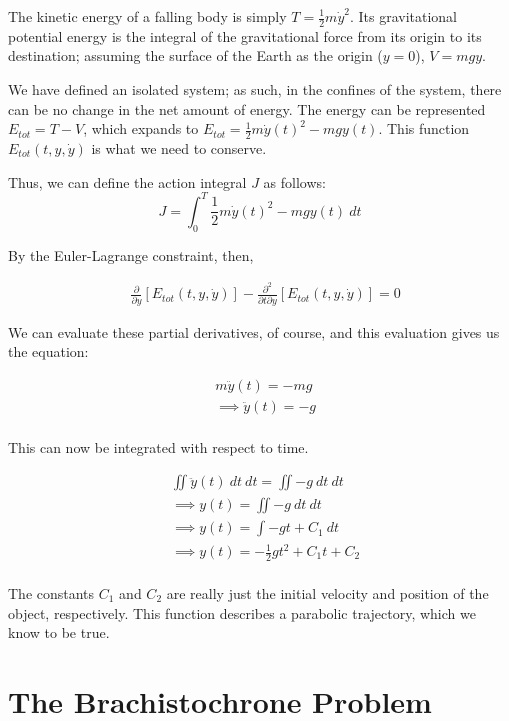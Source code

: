 \documentclass[%
 preprint,
 amsmath,amssymb,
 aps,
 pra,
 fleqn,
]{revtex4-2}
\begin{document}
The kinetic energy of a falling body is simply $\displaystyle T = \frac12 m\dot y^2$.  Its gravitational potential energy is the integral of the gravitational force from its origin to its destination; assuming the surface of the Earth as the origin ($y = 0$), $\displaystyle V = mgy$.

We have defined an isolated system; as such, in the confines of the system, there can be no change in the net amount of energy.  The energy can be represented $E_{tot} = T - V$, which expands to $\displaystyle E_{tot} = \frac12m\dot y(t)^2 - mgy(t)$.  This function $E_{tot}(t, y, \dot y)$ is what we need to conserve.

Thus, we can define the action integral $J$ as follows:
\[
    J = \int_0^T \frac12m\dot y(t)^2 - mgy(t) ~ dt
\]

By the Euler-Lagrange constraint, then,

\begin{align*}
  &\frac{∂}{∂y} \left[E_{tot}(t, y, \dot y)\right] - \frac{∂^2}{∂t∂y} \left[E_{tot}(t, y, \dot y)\right] = 0
\end{align*}

We can evaluate these partial derivatives, of course, and this evaluation gives us the equation:

\begin{align*}
  &m\ddot y(t) = -mg\\
  &⟹ \ddot y(t) = -g\\
\end{align*}

This can now be integrated with respect to time.

\begin{align*}
  &\iint \ddot y(t) ~ dt ~ dt = \iint -g ~ dt ~ dt\\
  &⟹ y(t) = \iint -g ~ dt ~ dt\\
  &⟹ y(t) = \int -gt + C_1 ~ dt\\
  &⟹ y(t) = -\frac12gt^2 + C_1t + C_2\\
\end{align*}

The constants $C_1$ and $C_2$ are really just the initial velocity and position of the object, respectively.  This function describes a parabolic trajectory, which we know to be true.

\section{The Brachistochrone Problem} %
\end{document}
